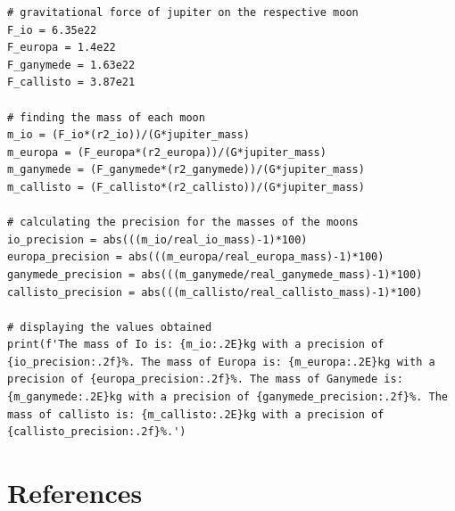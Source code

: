 \documentclass[12pt, a4paper]{article}
\begin{document}
\begin{verbatim}
# gravitational force of jupiter on the respective moon
F_io = 6.35e22
F_europa = 1.4e22
F_ganymede = 1.63e22
F_callisto = 3.87e21

# finding the mass of each moon
m_io = (F_io*(r2_io))/(G*jupiter_mass)
m_europa = (F_europa*(r2_europa))/(G*jupiter_mass)
m_ganymede = (F_ganymede*(r2_ganymede))/(G*jupiter_mass)
m_callisto = (F_callisto*(r2_callisto))/(G*jupiter_mass)

# calculating the precision for the masses of the moons
io_precision = abs(((m_io/real_io_mass)-1)*100)
europa_precision = abs(((m_europa/real_europa_mass)-1)*100)
ganymede_precision = abs(((m_ganymede/real_ganymede_mass)-1)*100)
callisto_precision = abs(((m_callisto/real_callisto_mass)-1)*100)

# displaying the values obtained
print(f'The mass of Io is: {m_io:.2E}kg with a precision of {io_precision:.2f}%. The mass of Europa is: {m_europa:.2E}kg with a precision of {europa_precision:.2f}%. The mass of Ganymede is: {m_ganymede:.2E}kg with a precision of {ganymede_precision:.2f}%. The mass of callisto is: {m_callisto:.2E}kg with a precision of {callisto_precision:.2f}%.')

\end{verbatim}

\section{References}
\printbibliography[heading = none]
\end{document}
